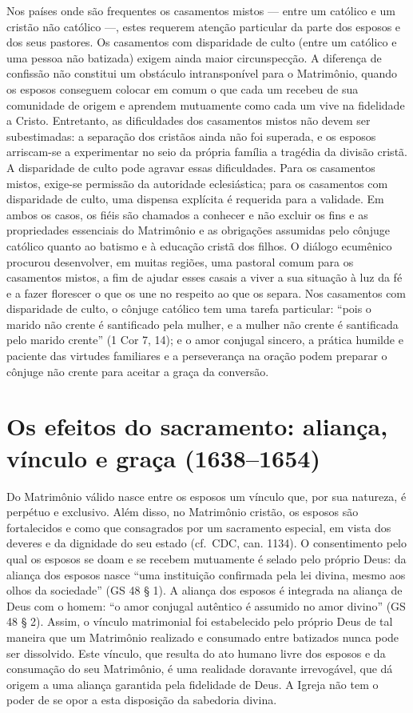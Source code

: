 Nos países onde são frequentes os casamentos mistos --- entre um católico e um cristão não católico ---, estes requerem atenção particular da parte dos esposos e dos seus pastores. Os casamentos com disparidade de culto (entre um católico e uma pessoa não batizada) exigem ainda maior circunspecção. A diferença de confissão não constitui um obstáculo intransponível para o Matrimônio, quando os esposos conseguem colocar em comum o que cada um recebeu de sua comunidade de origem e aprendem mutuamente como cada um vive na fidelidade a Cristo. Entretanto, as dificuldades dos casamentos mistos não devem ser subestimadas: a separação dos cristãos ainda não foi superada, e os esposos arriscam-se a experimentar no seio da própria família a tragédia da divisão cristã. A disparidade de culto pode agravar essas dificuldades. Para os casamentos mistos, exige-se permissão da autoridade eclesiástica; para os casamentos com disparidade de culto, uma dispensa explícita é requerida para a validade. Em ambos os casos, os fiéis são chamados a conhecer e não excluir os fins e as propriedades essenciais do Matrimônio e as obrigações assumidas pelo cônjuge católico quanto ao batismo e à educação cristã dos filhos. O diálogo ecumênico procurou desenvolver, em muitas regiões, uma pastoral comum para os casamentos mistos, a fim de ajudar esses casais a viver a sua situação à luz da fé e a fazer florescer o que os une no respeito ao que os separa. Nos casamentos com disparidade de culto, o cônjuge católico tem uma tarefa particular: ``pois o marido não crente é santificado pela mulher, e a mulher não crente é santificada pelo marido crente'' (1 Cor 7, 14); e o amor conjugal sincero, a prática humilde e paciente das virtudes familiares e a perseverança na oração podem preparar o cônjuge não crente para aceitar a graça da conversão.

\section{Os efeitos do sacramento: aliança, vínculo e graça (1638--1654)}

Do Matrimônio válido nasce entre os esposos um vínculo que, por sua natureza, é perpétuo e exclusivo. Além disso, no Matrimônio cristão, os esposos são fortalecidos e como que consagrados por um sacramento especial, em vista dos deveres e da dignidade do seu estado (cf.~CDC, can. 1134). O consentimento pelo qual os esposos se doam e se recebem mutuamente é selado pelo próprio Deus: da aliança dos esposos nasce ``uma instituição confirmada pela lei divina, mesmo aos olhos da sociedade'' (GS 48 § 1). A aliança dos esposos é integrada na aliança de Deus com o homem: ``o amor conjugal autêntico é assumido no amor divino'' (GS 48 § 2). Assim, o vínculo matrimonial foi estabelecido pelo próprio Deus de tal maneira que um Matrimônio realizado e consumado entre batizados nunca pode ser dissolvido. Este vínculo, que resulta do ato humano livre dos esposos e da consumação do seu Matrimônio, é uma realidade doravante irrevogável, que dá origem a uma aliança garantida pela fidelidade de Deus. A Igreja não tem o poder de se opor a esta disposição da sabedoria divina.

